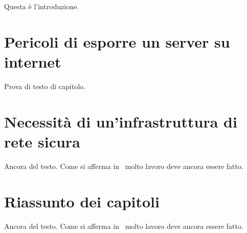 Questa è l'introduzione.

\section{Pericoli di esporre un server su internet}

Prova di testo di capitolo.

\section{Necessità di un'infrastruttura di rete sicura}

Ancora del testo. Come si afferma in~\cite{jones96analysis} molto lavoro deve ancora essere fatto.

\section{Riassunto dei capitoli}

Ancora del testo. Come si afferma in~\cite{jones96analysis} molto lavoro deve ancora essere fatto.
